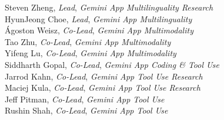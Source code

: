 \begin{minipage}[t]{0.50\linewidth}
Steven Zheng, \textit{Lead}, \textit{Gemini App Multilinguality Research} \\
HyunJeong Choe, \textit{Lead}, \textit{Gemini App Multilinguality} \\
Ágoston Weisz, \textit{Co-Lead}, \textit{Gemini App Multimodality} \\
Tao Zhu, \textit{Co-Lead}, \textit{Gemini App Multimodality} \\
Yifeng Lu, \textit{Co-Lead}, \textit{Gemini App Multimodality} \\
Siddharth Gopal, \textit{Co-Lead}, \textit{Gemini App Coding \& Tool Use} \\
Jarrod Kahn, \textit{Co-Lead}, \textit{Gemini App Tool Use Research} \\
Maciej Kula, \textit{Co-Lead}, \textit{Gemini App Tool Use Research} \\
Jeff Pitman, \textit{Co-Lead}, \textit{Gemini App Tool Use} \\
Rushin Shah, \textit{Co-Lead}, \textit{Gemini App Tool Use} \\

\end{minipage}
